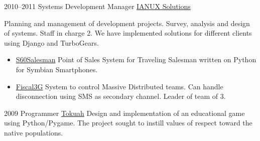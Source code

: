 \documentclass[11pt,a4paper]{moderncv}
\begin{document}
    \cventry
        {2010--2011}
        {Systems Development Manager}
        {\href{http://ianux.com.ar}{IANUX Solutions}} {} {}
        {
            Planning and management of development projects. Survey, analysis                                     %
                and design of systems. Staff in charge 2. We have implemented                                     %
                solutions for different clients using Django and TurboGears.                                      %
            \begin {itemize}                                                                                      %
                \item \href{http://github.com/pointtonull/S60Salesman}{S60Salesman}                               %
                      Point of Sales System for Traveling Salesman written on Python for                          %
                      Symbian Smartphones.                                                                        %
                \item \href{http://github.com/pointtonull/Fiscal3G}{Fiscal3G}                                     %
                      System to control Massive Distributed teams. Can handle                                     %
                      disconnection using SMS as secondary channel. Leader of team of                             %
                      3.                                                                                          %
            \end {itemize}                                                                                        %
        }

    \cventry                                                                                                      %
        {2009}                                                                                                    %
        {Programmer}                                                                                              %
        {\href{http://tokuah.com.ar}{Tokuah}} {} {}                                                               %
        {                                                                                                         %
            Design and implementation of an educational game using                                                %
                Python/Pygame.                                                                                    %
            The project sought to instill values of respect                                                       %
                toward the native populations.                                                                    %
        }                                                                                                         %
\end{document}
